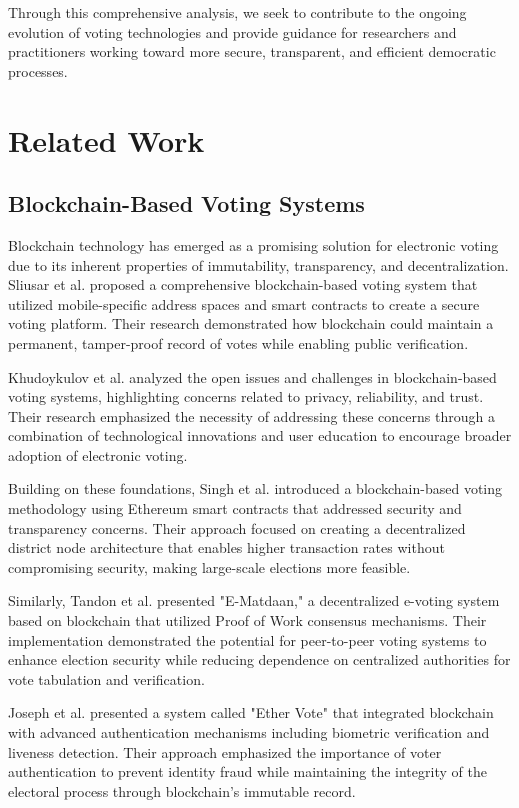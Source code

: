 \documentclass[conference]{IEEEtran}
\begin{document}
Through this comprehensive analysis, we seek to contribute to the ongoing evolution of voting technologies and provide guidance for researchers and practitioners working toward more secure, transparent, and efficient democratic processes.

\section{Related Work}
\subsection{Blockchain-Based Voting Systems}
Blockchain technology has emerged as a promising solution for electronic voting due to its inherent properties of immutability, transparency, and decentralization. Sliusar et al. \cite{b4} proposed a comprehensive blockchain-based voting system that utilized mobile-specific address spaces and smart contracts to create a secure voting platform. Their research demonstrated how blockchain could maintain a permanent, tamper-proof record of votes while enabling public verification.

Khudoykulov et al. \cite{b1} analyzed the open issues and challenges in blockchain-based voting systems, highlighting concerns related to privacy, reliability, and trust. Their research emphasized the necessity of addressing these concerns through a combination of technological innovations and user education to encourage broader adoption of electronic voting.

Building on these foundations, Singh et al. \cite{b5} introduced a blockchain-based voting methodology using Ethereum smart contracts that addressed security and transparency concerns. Their approach focused on creating a decentralized district node architecture that enables higher transaction rates without compromising security, making large-scale elections more feasible.

Similarly, Tandon et al. \cite{b3} presented "E-Matdaan," a decentralized e-voting system based on blockchain that utilized Proof of Work consensus mechanisms. Their implementation demonstrated the potential for peer-to-peer voting systems to enhance election security while reducing dependence on centralized authorities for vote tabulation and verification.

Joseph et al. \cite{b6} presented a system called "Ether Vote" that integrated blockchain with advanced authentication mechanisms including biometric verification and liveness detection. Their approach emphasized the importance of voter authentication to prevent identity fraud while maintaining the integrity of the electoral process through blockchain's immutable record.
\end{document}
